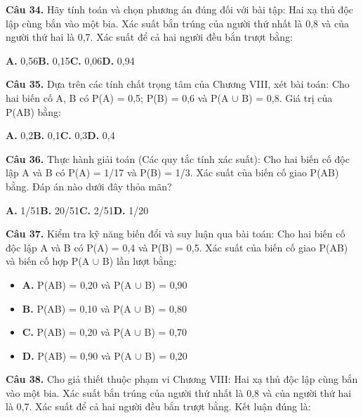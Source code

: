 \documentclass[11pt,a4paper]{article}
\begin{document}
\textbf{\color{primary} Câu 34.} Hãy tính toán và chọn phương án đúng đối với bài tập: Hai xạ thủ độc lập cùng bắn vào một bia. Xác suất bắn trúng của người thứ nhất là 0,8 và của người thứ hai là 0,7. Xác suất để cả hai người đều bắn trượt bằng:\par
\hspace*{1.5em}\textbf{A.} 0,56\quad\quad \textbf{B.} 0,15\quad\quad \textbf{C.} 0,06\quad\quad \textbf{D.} 0,94\par\vspace{2pt}
\textbf{\color{primary} Câu 35.} Dựa trên các tính chất trọng tâm của Chương VIII, xét bài toán: Cho hai biến cố A, B có P(A) = 0,5; P(B) = 0,6 và P(A $\cup$ B) = 0,8. Giá trị của P(AB) bằng:\par
\hspace*{1.5em}\textbf{A.} 0,2\quad\quad \textbf{B.} 0,1\quad\quad \textbf{C.} 0,3\quad\quad \textbf{D.} 0,4\par\vspace{2pt}
\textbf{\color{primary} Câu 36.} Thực hành giải toán (Các quy tắc tính xác suất): Cho hai biến cố độc lập A và B có P(A) = 1/17 và P(B) = 1/3. Xác suất của biến cố giao P(AB) bằng. Đáp án nào dưới đây thỏa mãn?\par
\hspace*{1.5em}\textbf{A.} 1/51\quad\quad \textbf{B.} 20/51\quad\quad \textbf{C.} 2/51\quad\quad \textbf{D.} 1/20\par\vspace{2pt}
\textbf{\color{primary} Câu 37.} Kiểm tra kỹ năng biến đổi và suy luận qua bài toán: Cho hai biến cố độc lập A và B có P(A) = 0,4 và P(B) = 0,5. Xác suất của biến cố giao P(AB) và biến cố hợp P(A $\cup$ B) lần lượt bằng:\par
\begin{itemize}\setlength{\itemsep}{1pt}\setlength{\parskip}{0pt}
  \item[] \textbf{A.} P(AB) = 0,20 và P(A $\cup$ B) = 0,90
  \item[] \textbf{B.} P(AB) = 0,10 và P(A $\cup$ B) = 0,80
  \item[] \textbf{C.} P(AB) = 0,20 và P(A $\cup$ B) = 0,70
  \item[] \textbf{D.} P(AB) = 0,90 và P(A $\cup$ B) = 0,20
\end{itemize}\vspace{2pt}
\textbf{\color{primary} Câu 38.} Cho giả thiết thuộc phạm vi Chương VIII: Hai xạ thủ độc lập cùng bắn vào một bia. Xác suất bắn trúng của người thứ nhất là 0,8 và của người thứ hai là 0,7. Xác suất để cả hai người đều bắn trượt bằng. Kết luận đúng là:\par
\end{document}
